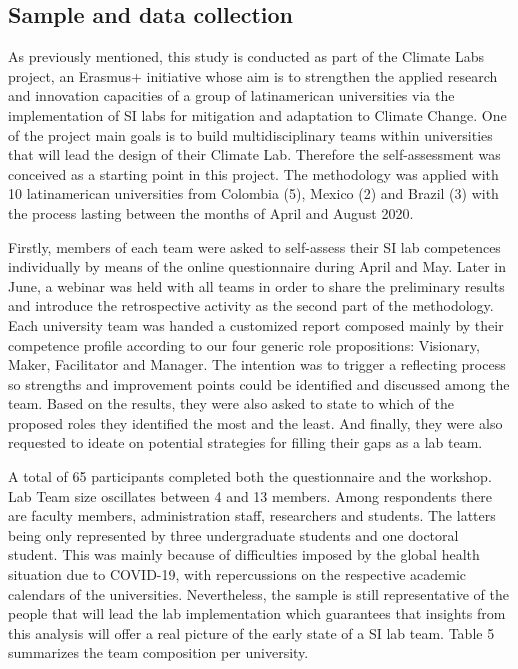 \documentclass[AMA,STIX1COL,APA,STIX2COL]{WileyNJD-v2}
\begin{document}
\hypertarget{sample-and-data-collection}{%
\subsection{Sample and data
collection}\label{sample-and-data-collection}}

As previously mentioned, this study is conducted as part of the Climate
Labs project, an Erasmus+ initiative whose aim is to strengthen the
applied research and innovation capacities of a group of latinamerican
universities via the implementation of SI labs for mitigation and
adaptation to Climate Change. One of the project main goals is to build
multidisciplinary teams within universities that will lead the design of
their Climate Lab. Therefore the self-assessment was conceived as a
starting point in this project. The methodology was applied with 10
latinamerican universities from Colombia (5), Mexico (2) and Brazil (3)
with the process lasting between the months of April and August 2020.

Firstly, members of each team were asked to self-assess their SI lab
competences individually by means of the online questionnaire during
April and May. Later in June, a webinar was held with all teams in order
to share the preliminary results and introduce the retrospective
activity as the second part of the methodology. Each university team was
handed a customized report composed mainly by their competence profile
according to our four generic role propositions: Visionary, Maker,
Facilitator and Manager. The intention was to trigger a reflecting
process so strengths and improvement points could be identified and
discussed among the team. Based on the results, they were also asked to
state to which of the proposed roles they identified the most and the
least. And finally, they were also requested to ideate on potential
strategies for filling their gaps as a lab team.

A total of 65 participants completed both the questionnaire and the
workshop. Lab Team size oscillates between 4 and 13 members. Among
respondents there are faculty members, administration staff, researchers
and students. The latters being only represented by three undergraduate
students and one doctoral student. This was mainly because of
difficulties imposed by the global health situation due to COVID-19,
with repercussions on the respective academic calendars of the
universities. Nevertheless, the sample is still representative of the
people that will lead the lab implementation which guarantees that
insights from this analysis will offer a real picture of the early state
of a SI lab team. Table 5 summarizes the team composition per
university.
\end{document}
